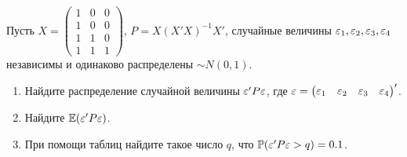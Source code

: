 \documentclass[pdftex,11pt,openany]{book}\usepackage[]{graphicx}\usepackage[]{color}
\begin{document}
\begin{problem}


Пусть $X = \begin{pmatrix} 1 & 0 & 0 \\ 1 & 0 & 0 \\ 1 & 1 & 0  \\ 1 & 1 & 1 \end{pmatrix} $, $P = X(X'X)^{-1}X'$, случайные величины $\varepsilon_1, \varepsilon_2, \varepsilon_3, \varepsilon_4$ независимы и одинаково распределены $\sim N (0,1)$.
\begin{enumerate}
\item Найдите распределение случайной величины $\varepsilon'P\varepsilon$, где $\varepsilon = \begin{pmatrix} \varepsilon_1 & \varepsilon_2 & \varepsilon_3 & \varepsilon_4 \end{pmatrix}'$.
\item Найдите $\mathbb{E}(\varepsilon'P\varepsilon)$.
\item При помощи таблиц найдите такое число $q$, что $\mathbb{P}(\varepsilon'P\varepsilon > q)=0.1$. 
\end{enumerate}
\end{problem}

\begin{solution}
\end{solution}
\end{document}
